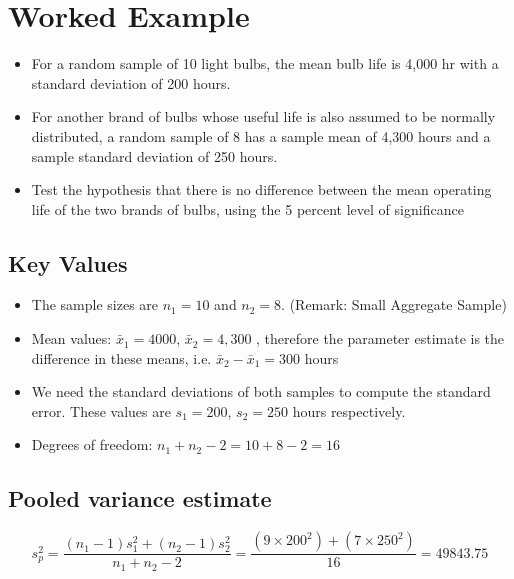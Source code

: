 \documentclass[a4paper,12pt]{article}
\begin{document}

\section*{Worked Example }
\begin{itemize}
\item For a random sample of 10 light bulbs, the mean bulb life is 4,000 hr with a standard deviation of 200 hours.
\item For another brand of bulbs whose useful life is also assumed to be normally distributed, a random sample of 8 has a sample mean of 4,300 hours
and a sample standard deviation of 250 hours. \item Test the hypothesis that there is no difference between the
mean operating life of the two brands of bulbs, using the 5 percent level of significance
\end{itemize}
\medskip 


\subsection*{Key Values}
\begin{itemize}\item The sample sizes are $n_1 = 10$ and $n_2 = 8$. (Remark: Small Aggregate Sample)
\item Mean values: $\bar{x}_1 = 4000$, $\bar{x}_2 = 4,300 $ , therefore the parameter estimate is the difference in these means, i.e. $\bar{x}_2 - \bar{x}_1 = 300$ hours
\item We need the standard deviations of both samples to compute the standard error. These values are $s_1  = 200$, $s_2 = 250$ hours respectively.
\item Degrees of freedom: $n_1 + n_2 - 2 = 10 + 8 - 2 = 16$
\end{itemize}\medskip 

\subsection*{Pooled variance estimate}

\[ s^2_p = \frac{(n_1 - 1)s^2_1  + (n_2 - 1)s^2_ 2}{n_1 + n_2 - 2 } = \frac{(9 \times 200^2 ) +( 7 \times 250^2) }{ 16 } = 49843.75 \]
\end{document}
